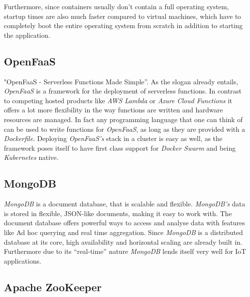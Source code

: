 Furthermore, since containers usually don't contain a full operating system, startup times are also
much faster compared to virtual machines, which have to completely boot the entire operating system
from scratch in addition to starting the application. \cite{docker-container}

\subsection{OpenFaaS}

"OpenFaaS - Serverless Functions Made Simple”. As the slogan already entails, \textit{OpenFaaS} is a
framework for the deployment of serverless functions. In contrast to competing hosted products like
\textit{AWS Lambda} or \textit{Azure Cloud Functions} it offers a lot more flexibility in the way
functions are written and hardware resources are managed. In fact any programming language that one
can think of can be used to write functions for \textit{OpenFaaS}, as long as they are provided with
a \textit{Dockerfile}. Deploying \textit{OpenFaaS's} stack in a cluster is easy as well, as the
framework poses itself to have first class support for \textit{Docker Swarm} and being
\textit{Kubernetes} native. \cite{openfaas-docs}

\subsection{MongoDB}

\textit{MongoDB} is a document database, that is scalable and flexible. \textit{MongoDB's} data is
 stored in flexible, JSON-like documents, making it easy to work with. The document database offers
 powerful ways to access and analyse data with features like Ad hoc querying and real time
 aggregation. Since \textit{MongoDB} is a distributed database at its core, high availability and
 horizontal scaling are already built in. Furthermore due to its “real-time” nature \textit{MongoDB}
 lends itself very well for IoT applications.  \cite{mongodb-description}

\subsection{Apache ZooKeeper}

